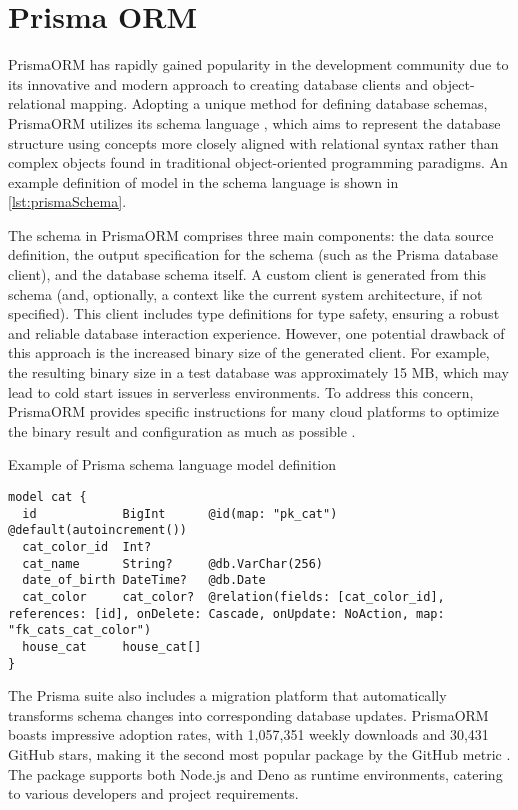 \section{Prisma ORM}

PrismaORM has rapidly gained popularity in the development community due to its
innovative and modern approach to creating database clients and
object-relational mapping. Adopting a unique method for defining database
schemas, PrismaORM utilizes its schema language \cite{prismaDocsSchema}, which
aims to represent the database structure using concepts more closely aligned
with relational syntax rather than complex objects found in traditional
object-oriented programming paradigms. An example definition of model in the
schema language is shown in \autoref{lst:prismaSchema}.

The schema in PrismaORM comprises three main components: the data source
definition, the output specification for the schema (such as the Prisma database
client), and the database schema itself. A custom client is generated from this
schema (and, optionally, a context like the current system architecture, if not
specified). This client includes type definitions for type safety, ensuring a
robust and reliable database interaction experience. However, one potential
drawback of this approach is the increased binary size of the generated client.
For example, the resulting binary size in a test database was approximately 15
MB, which may lead to cold start issues in serverless environments. To address
this concern, PrismaORM provides specific instructions for many cloud platforms
to optimize the binary result and configuration as much as possible
\cite{prismaDocsDeploy}.

\begin{listing}
\caption{Example of Prisma schema language model definition}
\label{lst:prismaSchema}
    \begin{verbatim}
model cat {
  id            BigInt      @id(map: "pk_cat") @default(autoincrement())
  cat_color_id  Int?
  cat_name      String?     @db.VarChar(256)
  date_of_birth DateTime?   @db.Date
  cat_color     cat_color?  @relation(fields: [cat_color_id], references: [id], onDelete: Cascade, onUpdate: NoAction, map: "fk_cats_cat_color")
  house_cat     house_cat[]
}
    \end{verbatim}
\end{listing}

The Prisma suite also includes a migration platform that automatically
transforms schema changes into corresponding database updates. PrismaORM boasts
impressive adoption rates, with 1,057,351 weekly downloads and 30,431 GitHub
stars, making it the second most popular package by the GitHub metric
\cite{prismaNpm} \cite{prismaGitHub}. The package supports both Node.js and Deno
as runtime environments, catering to various developers and project
requirements.

